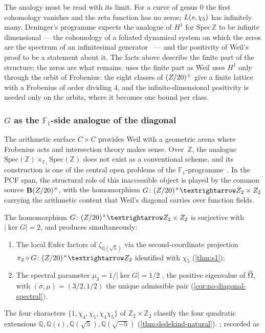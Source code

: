 The analogy must be read with its limit.  For a curve of genus $0$ the first
cohomology vanishes and the zeta function has no zeros; $L(s,\chi_5)$ has
infinitely many.  Deninger's programme expects the analogue of $H^1$ for
$\mathrm{Spec}\,\mathbb{Z}$ to be infinite dimensional --- the cohomology of a foliated
dynamical system on which the zeros are the spectrum of an infinitesimal
generator~\cite{deninger98} --- and the positivity of Weil's proof to be a statement
about it.  The facts above describe the finite part of the structure; the zeros are
what remains.   uses the finite part as Weil uses $H^1$ only through the orbit of
Frobenius: the eight classes of $(Z/20)^\times$ give a finite lattice with a Frobenius of
order dividing $4$, and the infinite-dimensional positivity is needed only on the orbits,
where it becomes one bound per class.

\subsubsection{$G$ as the $\mathbb{F}_1$-side analogue of the diagonal}
\label{ssec:G-diagonal}

The arithmetic surface $C\times C$ provides Weil with a geometric
arena where Frobenius acts and intersection theory makes sense.
Over~$\mathbb{Z}$, the analogue
$\mathrm{Spec}(\mathbb{Z})\times_{\mathbb{F}_1}\mathrm{Spec}(\mathbb{Z})$
does not exist as a conventional scheme, and its construction is
one of the central open problems of the
$\mathbb{F}_1$-programme~\cite{connesconsani10}.  In the PCF span,
the structural role of this inaccessible object is played by the
common source $\mathbf{B}(Z/20)^{\times}$, with the homomorphism
$G\colon\Zst\to\mathbb{Z}_2\times\mathbb{Z}_2$ carrying the
arithmetic content that Weil's diagonal carries over function
fields.

\begin{theorem}\label{thm:G-source}
The homomorphism
$G\colon\Zst\to\mathbb{Z}_2\times\mathbb{Z}_2$ is surjective
with $|\ker G|=2$, and produces simultaneously:
\begin{enumerate}[label=\textup{(\alph*)}]
\item The local Euler factors of $\zeta_{\mathbb{Q}(\sqrt{5})}$
  via the second-coordinate projection
  $\pi_2\circ G\colon\Zst\to\mathbb{Z}_2$ identified with
  $\chi_5$ \textup{(\cref{thm:s1})};
\item The spectral parameter $\mu_3=1/|\ker G|=1/2$ , the positive eigenvalue of
  $\widehat{\Omega}$, with $(\sigma,\mu)=(3/2,1/2)$ the unique admissible pair
  \textup{(\cref{cor:no-diagonal-spectral})}.
\end{enumerate}
The four characters $\{1,\chi_4,\chi_5,\chi_4\chi_5\}$ of
$\mathbb{Z}_2\times\mathbb{Z}_2$ classify the four quadratic
extensions $\mathbb{Q}, \mathbb{Q}(i), \mathbb{Q}(\sqrt{5}),
\mathbb{Q}(\sqrt{-5})$ \textup{(\cref{thm:dedekind-natural})}.
; recorded as
\end{theorem}

